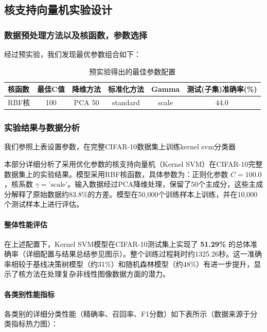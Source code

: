\documentclass[UTF8]{report}
\theoremstyle{MyLineTheoremStyle} %
\theoremstyle{MyBlockTheoremStyle} %
\theoremstyle{MySubsubsectionStyle} %
\begin{document}
\subsection{核支持向量机实验设计}
\subsubsection{数据预处理方法以及核函数，参数选择}
经过预实验，我们发现最优参数组合如下：
\begin{table}[h]
\centering
\caption{预实验得出的最佳参数配置}
\begin{tabular}{l c c c c c}
\toprule
\textbf{核函数} & \textbf{最佳C值} & \textbf{降维方法} & \textbf{标准化方法} & \textbf{Gamma} & \textbf{测试(子集)准确率(\%)} \\
\midrule
RBF核 & 100 & PCA  50& standard & scale & 44.0 \\
\bottomrule
\end{tabular}
\end{table}
\label{sec:svm_results_analysis}

\subsubsection{实验结果与数据分析}
我们参照上表设置参数，在完整CIFAR-10数据集上训练kernel svm分类器

本部分详细分析了采用优化参数的核支持向量机（Kernel SVM）在CIFAR-10完整数据集上的实验结果。模型采用RBF核函数，具体参数为：正则化参数 $C=100.0$，核系数 $\gamma = \text{'scale'}$。输入数据经过PCA降维处理，保留了50个主成分，这些主成分解释了原始数据约83.8\%的方差。模型在50,000个训练样本上训练，并在10,000个测试样本上进行评估。

\paragraph{整体性能评估}
在上述配置下，Kernel SVM模型在CIFAR-10测试集上实现了 \textbf{51.29\%} 的总体准确率（详细配置与结果总结参见图示）。整个训练过程耗时约1325.26秒。这一准确率相较于基线决策树模型（约31\%）和随机森林模型（约48\%）有进一步提升，显示了核方法在处理复杂非线性图像数据方面的潜力。

\paragraph{各类别性能指标}
各类别的详细分类性能（精确率、召回率、F1分数）如下表所示（数据来源于分类指标热力图）：
\end{document}
